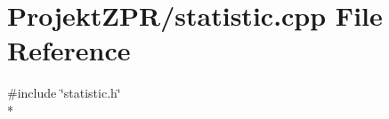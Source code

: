 \section{Projekt\-Z\-P\-R/statistic.cpp File Reference}
\label{statistic_8cpp}
{\ttfamily \#include \char`\"{}statistic.\-h\char`\"{}}\\*
